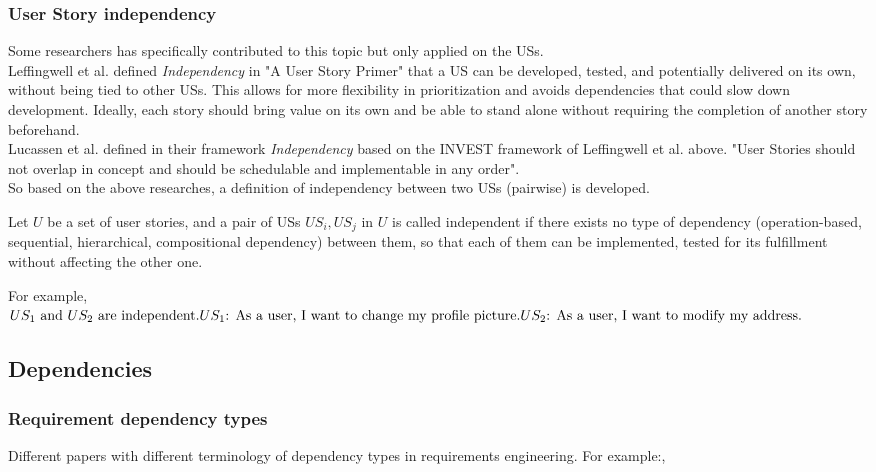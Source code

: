 \documentclass[a4paper, 11 pt, leqno, titlepage = true, toc=bib, oneside]{scrbook}
\begin{document}
\subsubsection{User Story independency}
Some researchers has specifically contributed to this topic but only applied on the USs. \\
Leffingwell et al. \cite{Leffingwell2009} defined \textit{Independency} in "A User Story Primer" that a US can be developed, tested, and potentially delivered on its own, without being tied to other USs. This allows for more flexibility in prioritization and avoids dependencies that could slow down development. Ideally, each story should bring value on its own and be able to stand alone without requiring the completion of another story beforehand. \\
Lucassen et al. defined in their framework \textit{Independency} based on the INVEST framework of Leffingwell et al. above. "User Stories should not overlap in concept and should be schedulable and implementable in any order".\cite{LucassenFramework}\\
So based on the above researches, a definition of independency between two USs (pairwise) is developed.
\begin{defin}
    Let $U$ be a set of user stories, and  a pair of USs $US_{i},US_{j}$ in $U$ is called independent if there exists no type of dependency (operation-based, sequential, hierarchical, compositional dependency) between them, so that each of them can be implemented, tested for its fulfillment without affecting the other one.
\end{defin}
For example, \begin{math}
    US_{1} \text{ and } US_{2} \text{ are independent.} \newline
    US_{1} \text{: As a user, I want to change my profile picture.}
    \newline
    US_{2} \text{: As a user, I want to modify my address.}
\end{math}


\subsection{Dependencies}
\subsubsection{Requirement dependency types}
Different papers with different terminology of dependency types in requirements engineering. For example:,
\end{document}
